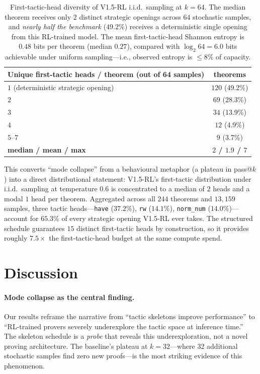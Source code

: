 \documentclass{article}
\begin{document}
\begin{table}[h]
\centering
\small
\begin{tabular}{lc}
\toprule
\textbf{Unique first-tactic heads / theorem (out of 64 samples)} & \textbf{theorems} \\
\midrule
$1$ (deterministic strategic opening) & $120$ (49.2\%) \\
$2$ & $69$ (28.3\%) \\
$3$ & $34$ (13.9\%) \\
$4$ & $12$ (4.9\%) \\
$5$--$7$ & $9$ (3.7\%) \\
\midrule
\textbf{median / mean / max} & \textbf{$2$ / $1.9$ / $7$} \\
\bottomrule
\end{tabular}
\caption{First-tactic-head diversity of V1.5-RL i.i.d.\ sampling at $k{=}64$. The median theorem receives only $2$ distinct strategic openings across $64$ stochastic samples, and \emph{nearly half the benchmark} ($49.2\%$) receives a deterministic single opening from this RL-trained model. The mean first-tactic-head Shannon entropy is $0.48$ bits per theorem (median $0.27$), compared with $\log_2 64 = 6.0$ bits achievable under uniform sampling---i.e., observed entropy is $\le 8\%$ of capacity.}
\label{tab:first_tactic}
\end{table}

This converts ``mode collapse'' from a behavioural metaphor (a plateau in pass@$k$) into a direct distributional statement: V1.5-RL's first-tactic distribution under i.i.d.\ sampling at temperature $0.6$ is concentrated to a median of $2$ heads and a modal $1$ head per theorem. Aggregated across all $244$ theorems and $13{,}159$ samples, three tactic heads---\texttt{have} ($37.2\%$), \texttt{rw} ($14.1\%$), \texttt{norm\_num} ($14.0\%$)---account for $65.3\%$ of every strategic opening V1.5-RL ever takes. The structured schedule guarantees $15$ distinct first-tactic heads by construction, so it provides roughly $7.5\times$ the first-tactic-head budget at the same compute spend.


\section{Discussion}
\label{sec:discussion}

\paragraph{Mode collapse as the central finding.}
Our results reframe the narrative from ``tactic skeletons improve performance'' to ``RL-trained provers severely underexplore the tactic space at inference time.'' The skeleton schedule is a \emph{probe} that reveals this underexploration, not a novel proving architecture. The baseline's plateau at $k{=}32$---where 32 additional stochastic samples find zero new proofs---is the most striking evidence of this phenomenon.
\end{document}
